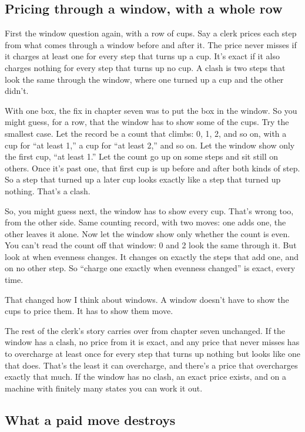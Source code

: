 \documentclass[11pt,twoside]{article}
\theoremstyle{thielethm}
\theoremstyle{thieledef}
\theoremstyle{thieledef}
\theoremstyle{thieledef}
\theoremstyle{thielethm}
\theoremstyle{thieleobs}
\theoremstyle{thielethm}
\begin{document}
\subsection{Pricing through a window, with a whole row}

First the window question again, with a row of cups. Say a clerk prices each step from what comes through a window before and after it. The price never misses if it charges at least one for every step that turns up a cup. It's exact if it also charges nothing for every step that turns up no cup. A clash is two steps that look the same through the window, where one turned up a cup and the other didn't.

With one box, the fix in chapter seven was to put the box in the window. So you might guess, for a row, that the window has to show some of the cups. Try the smallest case. Let the record be a count that climbs: 0, 1, 2, and so on, with a cup for ``at least 1,'' a cup for ``at least 2,'' and so on. Let the window show only the first cup, ``at least 1.'' Let the count go up on some steps and sit still on others. Once it's past one, that first cup is up before and after both kinds of step. So a step that turned up a later cup looks exactly like a step that turned up nothing. That's a clash.

So, you might guess next, the window has to show every cup. That's wrong too, from the other side. Same counting record, with two moves: one adds one, the other leaves it alone. Now let the window show only whether the count is even. You can't read the count off that window: 0 and 2 look the same through it. But look at when evenness changes. It changes on exactly the steps that add one, and on no other step. So ``charge one exactly when evenness changed'' is exact, every time.

That changed how I think about windows. A window doesn't have to show the cups to price them. It has to show them move.

The rest of the clerk's story carries over from chapter seven unchanged. If the window has a clash, no price from it is exact, and any price that never misses has to overcharge at least once for every step that turns up nothing but looks like one that does. That's the least it can overcharge, and there's a price that overcharges exactly that much. If the window has no clash, an exact price exists, and on a machine with finitely many states you can work it out.

\subsection{What a paid move destroys}
\end{document}
